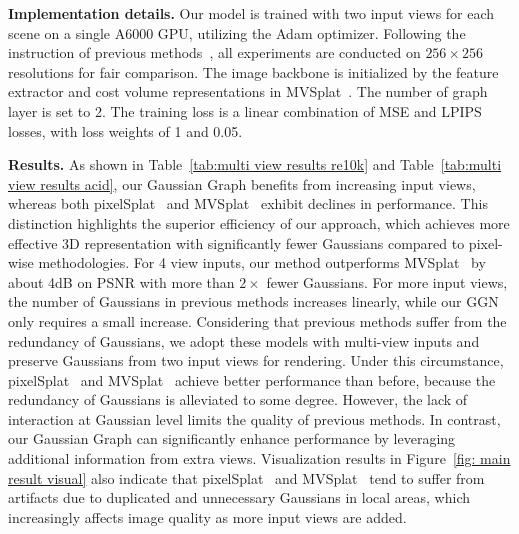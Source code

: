 \textbf{Implementation details.} Our model is trained with two input views for each scene on a single A6000 GPU, utilizing the Adam optimizer. Following the instruction of previous methods~\cite{pixelSplat2023arXiv, MVSplat2024arXiv}, all experiments are conducted on $256\times256$ resolutions for fair comparison. The image backbone is initialized by the feature extractor and cost volume representations in MVSplat~\cite{MVSplat2024arXiv}. The number of graph layer is set to 2. The training loss is a linear combination of MSE and LPIPS~\cite{LPIPS2018CVPR} losses, with loss weights of 1 and 0.05.

\textbf{Results.} As shown in Table~\ref{tab:multi view results re10k} and Table~\ref{tab:multi view results acid}, our Gaussian Graph benefits from increasing input views, whereas both pixelSplat~\cite{pixelSplat2023arXiv} and MVSplat~\cite{MVSplat2024arXiv} exhibit declines in performance. This distinction highlights the superior efficiency of our approach, which achieves more effective 3D representation with significantly fewer Gaussians compared to pixel-wise methodologies. For 4 view inputs, our method outperforms MVSplat~\cite{MVSplat2024arXiv} by about 4dB on PSNR with more than $2\times$ fewer Gaussians. For more input views, the number of Gaussians in previous methods increases linearly, while our GGN only requires a small increase.
Considering that previous methods suffer from the redundancy of Gaussians, we adopt these models with multi-view inputs and preserve Gaussians from two input views for rendering.
Under this circumstance, pixelSplat~\cite{pixelSplat2023arXiv} and MVSplat~\cite{MVSplat2024arXiv} achieve better performance than before, because the redundancy of Gaussians is alleviated to some degree. However, the lack of interaction at Gaussian level limits the quality of previous methods.
In contrast, our Gaussian Graph can significantly enhance performance by leveraging additional information from extra views. Visualization results in Figure~\ref{fig: main result visual} also indicate that pixelSplat~\cite{pixelSplat2023arXiv} and MVSplat~\cite{MVSplat2024arXiv} tend to suffer from artifacts due to duplicated and unnecessary Gaussians in local areas, which increasingly affects image quality as more input views are added.

